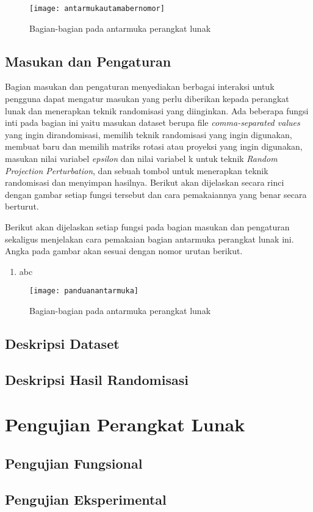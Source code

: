 \begin{figure}
	\centering
	\texttt{[image: antarmukautamabernomor]}
	\caption{Bagian-bagian pada antarmuka perangkat lunak}
	\label{fig:antarmukautamabernomor}
\end{figure}

\subsection{Masukan dan Pengaturan}
\label{sec:masukanpengaturan}

Bagian masukan dan pengaturan menyediakan berbagai interaksi untuk pengguna dapat mengatur masukan yang perlu diberikan kepada perangkat lunak dan menerapkan teknik randomisasi yang diinginkan. Ada beberapa fungsi inti pada bagian ini yaitu masukan dataset berupa file \textit{comma-separated values} yang ingin dirandomisasi, memilih teknik randomisasi yang ingin digunakan, membuat baru dan memilih matriks rotasi atau proyeksi yang ingin digunakan, masukan nilai variabel \textit{epsilon} dan nilai variabel k untuk teknik \textit{Random Projection Perturbation}, dan sebuah tombol untuk menerapkan teknik randomisasi dan menyimpan hasilnya. Berikut akan dijelaskan secara rinci dengan gambar setiap fungsi tersebut dan cara pemakaiannya yang benar secara berturut.

Berikut akan dijelaskan setiap fungsi pada bagian masukan dan pengaturan sekaligus menjelakan cara pemakaian bagian antarmuka perangkat lunak ini. Angka pada gambar   akan sesuai dengan nomor urutan berikut.
\begin{enumerate}
    \item abc
\end{enumerate}

\begin{figure}
	\centering
	\texttt{[image: panduanantarmuka]}
	\caption{Bagian-bagian pada antarmuka perangkat lunak}
	\label{fig:panduanantarmuka}
\end{figure}


\subsection{Deskripsi Dataset}
\label{sec:deskripsidataset}

\subsection{Deskripsi Hasil Randomisasi}
\label{sec:masukanpengaturan}



\section{Pengujian Perangkat Lunak}
\label{sec:pengujianpl}

\subsection{Pengujian Fungsional}
\label{sec:pengujianfungsional}

\subsection{Pengujian Eksperimental}
\label{sec:pengujianeksperimental}